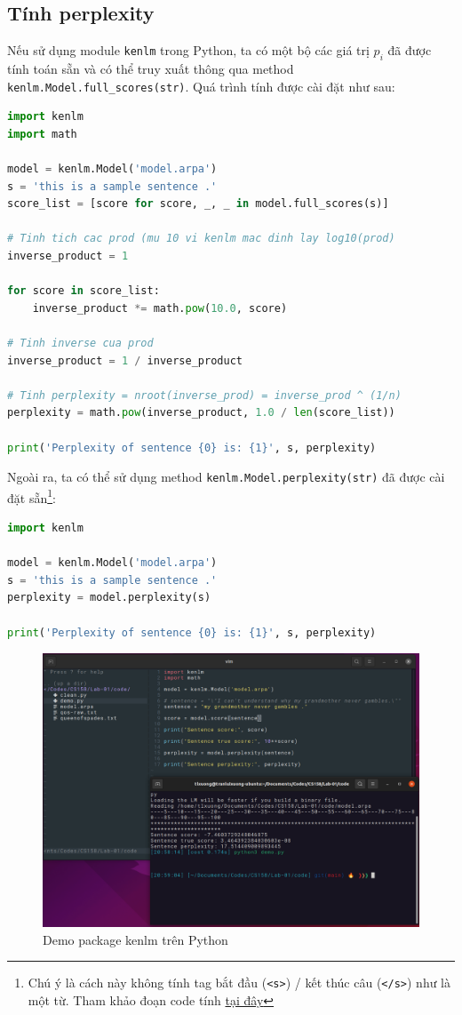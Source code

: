 \documentclass[12pt]{article}
\begin{document}
\subsection{Tính perplexity}
Nếu sử dụng module \texttt{kenlm} trong Python, ta có một bộ các giá trị $p_i$ đã được tính toán sẵn và có thể truy xuất thông qua method \texttt{kenlm.Model.full\_scores(str)}. Quá trình tính được cài đặt như sau:
\begin{lstlisting}[language=python]
import kenlm
import math

model = kenlm.Model('model.arpa')
s = 'this is a sample sentence .'
score_list = [score for score, _, _ in model.full_scores(s)]

# Tinh tich cac prod (mu 10 vi kenlm mac dinh lay log10(prod)
inverse_product = 1

for score in score_list:
    inverse_product *= math.pow(10.0, score)

# Tinh inverse cua prod
inverse_product = 1 / inverse_product

# Tinh perplexity = nroot(inverse_prod) = inverse_prod ^ (1/n)
perplexity = math.pow(inverse_product, 1.0 / len(score_list))

print('Perplexity of sentence {0} is: {1}', s, perplexity)
\end{lstlisting}
Ngoài ra, ta có thể sử dụng method \texttt{kenlm.Model.perplexity(str)} đã được cài đặt sẵn\footnote{Chú ý là cách này không tính tag bắt đầu (\texttt{<s>}) / kết thúc câu (\texttt{</s>}) như là một từ. Tham khảo đoạn code tính \href{https://github.com/kpu/kenlm/blob/217e219a34f8ac5d096b2fff3dede82b5a182a88/python/kenlm.pyx\#L209-L215}{tại đây}}:
\begin{lstlisting}[language=python]
import kenlm

model = kenlm.Model('model.arpa')
s = 'this is a sample sentence .'
perplexity = model.perplexity(s)

print('Perplexity of sentence {0} is: {1}', s, perplexity)
\end{lstlisting}

\begin{figure}[h]
    \centering
    \includegraphics[scale=.70]{python-demo.PNG}
    \caption{Demo package kenlm trên Python}
\end{figure}
\end{document}
